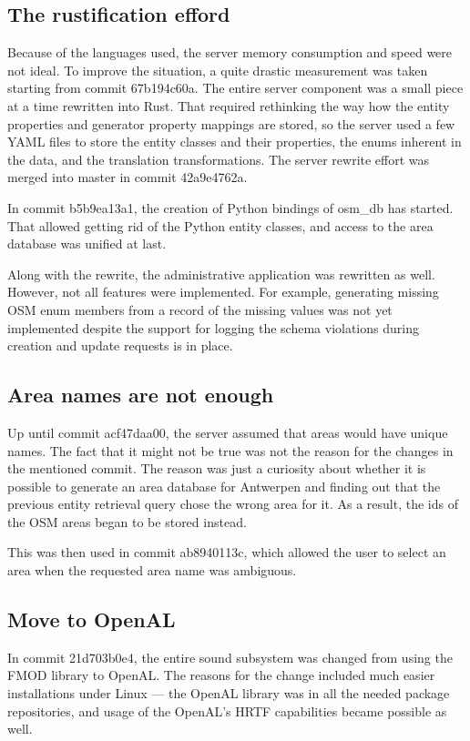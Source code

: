 \documentclass[nolof,digital]{fithesis3}
\begin{document}
\subsection{The rustification efford}
Because of the languages used, the server memory consumption and speed were not ideal. To improve the situation, a quite drastic measurement was taken starting from commit 67b194c60a. The entire server component was a small piece at a time rewritten into Rust. That required rethinking the way how the entity properties and generator property mappings are stored, so the server used a few YAML files to store the entity classes and their properties, the enums inherent in the data, and the translation transformations. The server rewrite effort was merged into master in commit 42a9e4762a.

In commit b5b9ea13a1, the creation of Python bindings of osm\_db has started. That allowed getting rid of the Python entity classes, and access to the area database was unified at last.

Along with the rewrite, the administrative application was rewritten as well. However, not all features were implemented. For example, generating missing OSM enum members from a record of the missing values was not yet implemented despite the support for logging the schema violations during creation and update requests is in place.
\subsection{Area names are not enough}
Up until commit acf47daa00, the server assumed that areas would have unique names. The fact that it might not be true was not the reason for the changes in the mentioned commit. The reason was just a curiosity about whether it is possible to generate an area database for Antwerpen and finding out that the previous entity retrieval query chose the wrong area for it. As a result, the ids of the OSM areas began to be stored instead.

This was then used in commit ab8940113c, which allowed the user to select an area when the requested area name was ambiguous.
\subsection{Move to OpenAL}
In commit 21d703b0e4, the entire sound subsystem was changed from using the FMOD library \parencite{fmod} to OpenAL. The reasons for the change included much easier installations under Linux --- the OpenAL library was in all the needed package repositories, and usage of the OpenAL's HRTF capabilities became possible as well.
\end{document}
